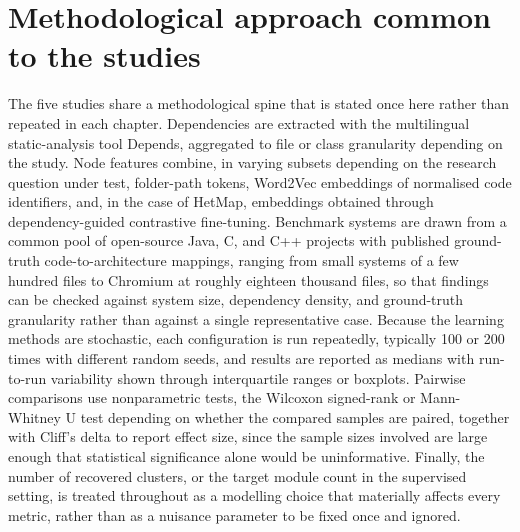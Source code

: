 \section{Methodological approach common to the studies}
\label{sec:common-method}

The five studies share a methodological spine that is stated once here rather than repeated in each chapter. Dependencies are extracted with the multilingual static-analysis tool Depends, aggregated to file or class granularity depending on the study. Node features combine, in varying subsets depending on the research question under test, folder-path tokens, Word2Vec embeddings of normalised code identifiers, and, in the case of HetMap, embeddings obtained through dependency-guided contrastive fine-tuning. Benchmark systems are drawn from a common pool of open-source Java, C, and C++ projects with published ground-truth code-to-architecture mappings, ranging from small systems of a few hundred files to Chromium at roughly eighteen thousand files, so that findings can be checked against system size, dependency density, and ground-truth granularity rather than against a single representative case. Because the learning methods are stochastic, each configuration is run repeatedly, typically 100 or 200 times with different random seeds, and results are reported as medians with run-to-run variability shown through interquartile ranges or boxplots. Pairwise comparisons use nonparametric tests, the Wilcoxon signed-rank or Mann-Whitney U test depending on whether the compared samples are paired, together with Cliff's delta to report effect size, since the sample sizes involved are large enough that statistical significance alone would be uninformative. Finally, the number of recovered clusters, or the target module count in the supervised setting, is treated throughout as a modelling choice that materially affects every metric, rather than as a nuisance parameter to be fixed once and ignored.